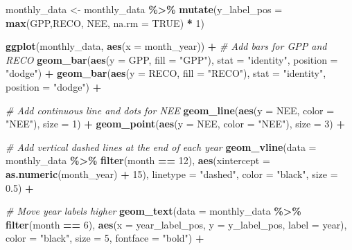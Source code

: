 \documentclass[
]{article}
\newenvironment{Shaded}{\begin{snugshade}}{\end{snugshade}}
\newcommand{\AttributeTok}[1]{\textcolor[rgb]{0.13,0.29,0.53}{#1}}
\newcommand{\CommentTok}[1]{\textcolor[rgb]{0.56,0.35,0.01}{\textit{#1}}}
\newcommand{\ConstantTok}[1]{\textcolor[rgb]{0.56,0.35,0.01}{#1}}
\newcommand{\DecValTok}[1]{\textcolor[rgb]{0.00,0.00,0.81}{#1}}
\newcommand{\FloatTok}[1]{\textcolor[rgb]{0.00,0.00,0.81}{#1}}
\newcommand{\FunctionTok}[1]{\textcolor[rgb]{0.13,0.29,0.53}{\textbf{#1}}}
\newcommand{\NormalTok}[1]{#1}
\newcommand{\OtherTok}[1]{\textcolor[rgb]{0.56,0.35,0.01}{#1}}
\newcommand{\SpecialCharTok}[1]{\textcolor[rgb]{0.81,0.36,0.00}{\textbf{#1}}}
\newcommand{\StringTok}[1]{\textcolor[rgb]{0.31,0.60,0.02}{#1}}
\begin{document}
\begin{Shaded}
\begin{Highlighting}[]
\NormalTok{monthly\_data }\OtherTok{\textless{}{-}}\NormalTok{ monthly\_data }\SpecialCharTok{\%\textgreater{}\%}
  \FunctionTok{mutate}\NormalTok{(}\AttributeTok{y\_label\_pos =} \FunctionTok{max}\NormalTok{(GPP,RECO, NEE, }\AttributeTok{na.rm =} \ConstantTok{TRUE}\NormalTok{) }\SpecialCharTok{*} \DecValTok{1}\NormalTok{)}

\FunctionTok{ggplot}\NormalTok{(monthly\_data, }\FunctionTok{aes}\NormalTok{(}\AttributeTok{x =}\NormalTok{ month\_year)) }\SpecialCharTok{+}
  \CommentTok{\# Add bars for GPP and RECO}
  \FunctionTok{geom\_bar}\NormalTok{(}\FunctionTok{aes}\NormalTok{(}\AttributeTok{y =}\NormalTok{ GPP, }\AttributeTok{fill =} \StringTok{"GPP"}\NormalTok{), }\AttributeTok{stat =} \StringTok{"identity"}\NormalTok{, }\AttributeTok{position =} \StringTok{"dodge"}\NormalTok{) }\SpecialCharTok{+}
  \FunctionTok{geom\_bar}\NormalTok{(}\FunctionTok{aes}\NormalTok{(}\AttributeTok{y =}\NormalTok{ RECO, }\AttributeTok{fill =} \StringTok{"RECO"}\NormalTok{), }\AttributeTok{stat =} \StringTok{"identity"}\NormalTok{, }\AttributeTok{position =} \StringTok{"dodge"}\NormalTok{) }\SpecialCharTok{+}
  
  \CommentTok{\# Add continuous line and dots for NEE}
  \FunctionTok{geom\_line}\NormalTok{(}\FunctionTok{aes}\NormalTok{(}\AttributeTok{y =}\NormalTok{ NEE, }\AttributeTok{color =} \StringTok{"NEE"}\NormalTok{), }\AttributeTok{size =} \DecValTok{1}\NormalTok{) }\SpecialCharTok{+}
  \FunctionTok{geom\_point}\NormalTok{(}\FunctionTok{aes}\NormalTok{(}\AttributeTok{y =}\NormalTok{ NEE, }\AttributeTok{color =} \StringTok{"NEE"}\NormalTok{), }\AttributeTok{size =} \DecValTok{3}\NormalTok{) }\SpecialCharTok{+}
  
  \CommentTok{\# Add vertical dashed lines at the end of each year}
  \FunctionTok{geom\_vline}\NormalTok{(}\AttributeTok{data =}\NormalTok{ monthly\_data }\SpecialCharTok{\%\textgreater{}\%} \FunctionTok{filter}\NormalTok{(month }\SpecialCharTok{==} \DecValTok{12}\NormalTok{), }
             \FunctionTok{aes}\NormalTok{(}\AttributeTok{xintercept =} \FunctionTok{as.numeric}\NormalTok{(month\_year) }\SpecialCharTok{+} \DecValTok{15}\NormalTok{), }
             \AttributeTok{linetype =} \StringTok{"dashed"}\NormalTok{, }\AttributeTok{color =} \StringTok{"black"}\NormalTok{, }\AttributeTok{size =} \FloatTok{0.5}\NormalTok{) }\SpecialCharTok{+}

  \CommentTok{\# Move year labels higher}
  \FunctionTok{geom\_text}\NormalTok{(}\AttributeTok{data =}\NormalTok{ monthly\_data }\SpecialCharTok{\%\textgreater{}\%} \FunctionTok{filter}\NormalTok{(month }\SpecialCharTok{==} \DecValTok{6}\NormalTok{), }
            \FunctionTok{aes}\NormalTok{(}\AttributeTok{x =}\NormalTok{ year\_label\_pos, }\AttributeTok{y =}\NormalTok{ y\_label\_pos, }\AttributeTok{label =}\NormalTok{ year), }
            \AttributeTok{color =} \StringTok{"black"}\NormalTok{, }\AttributeTok{size =} \DecValTok{5}\NormalTok{, }\AttributeTok{fontface =} \StringTok{"bold"}\NormalTok{) }\SpecialCharTok{+}
  

\end{Highlighting}
\end{Shaded}
\end{document}
